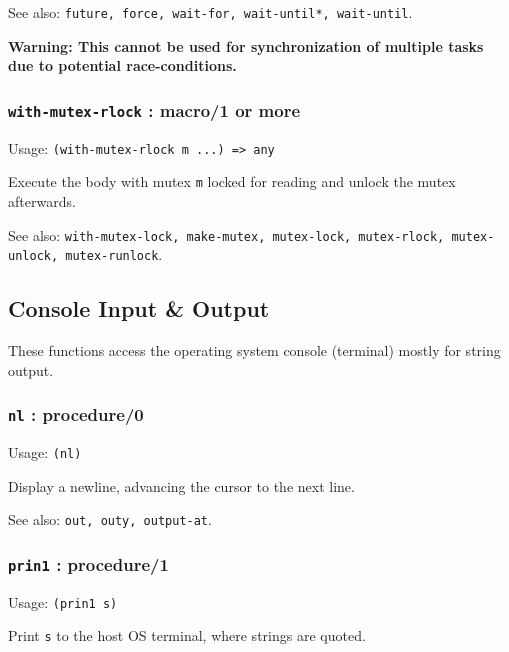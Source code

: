 \documentclass[
]{article}
\newcommand{\passthrough}[1]{#1}
\begin{document}
See also:
\passthrough{\lstinline!future, force, wait-for, wait-until*, wait-until!}.

\textbf{Warning: This cannot be used for synchronization of multiple
tasks due to potential race-conditions.}

\hypertarget{with-mutex-rlock-macro1-or-more}{%
\subsubsection{\texorpdfstring{\texttt{with-mutex-rlock} : macro/1 or
more}{with-mutex-rlock : macro/1 or more}}\label{with-mutex-rlock-macro1-or-more}}

Usage: \passthrough{\lstinline!(with-mutex-rlock m ...) => any!}

Execute the body with mutex \passthrough{\lstinline!m!} locked for
reading and unlock the mutex afterwards.

See also:
\passthrough{\lstinline!with-mutex-lock, make-mutex, mutex-lock, mutex-rlock, mutex-unlock, mutex-runlock!}.

\hypertarget{console-input-output}{%
\subsection{Console Input \& Output}\label{console-input-output}}

These functions access the operating system console (terminal) mostly
for string output.

\hypertarget{nl-procedure0}{%
\subsubsection{\texorpdfstring{\texttt{nl} :
procedure/0}{nl : procedure/0}}\label{nl-procedure0}}

Usage: \passthrough{\lstinline!(nl)!}

Display a newline, advancing the cursor to the next line.

See also: \passthrough{\lstinline!out, outy, output-at!}.

\hypertarget{prin1-procedure1}{%
\subsubsection{\texorpdfstring{\texttt{prin1} :
procedure/1}{prin1 : procedure/1}}\label{prin1-procedure1}}

Usage: \passthrough{\lstinline!(prin1 s)!}

Print \passthrough{\lstinline!s!} to the host OS terminal, where strings
are quoted.
\end{document}

